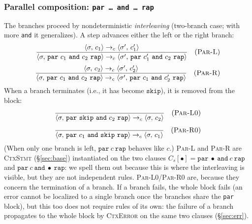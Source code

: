 \subsubsection{Parallel composition: \texttt{par\,\dots\,and\,\dots\,rap}}
\label{sec:par}
The branches proceed by nondeterministic \emph{interleaving} (two-branch case; with
more \texttt{and} it generalizes). A step advances either the left or the right branch:
\[
\dfrac{\cfg{c_1}{\sigma} \toc \cfg{c_1'}{\sigma'}}
      {\cfg{\mathtt{par}\ c_1\ \mathtt{and}\ c_2\ \mathtt{rap}}{\sigma} \toc
       \cfg{\mathtt{par}\ c_1'\ \mathtt{and}\ c_2\ \mathtt{rap}}{\sigma'}} \rname{Par-L}
\]
\[
\dfrac{\cfg{c_2}{\sigma} \toc \cfg{c_2'}{\sigma'}}
      {\cfg{\mathtt{par}\ c_1\ \mathtt{and}\ c_2\ \mathtt{rap}}{\sigma} \toc
       \cfg{\mathtt{par}\ c_1\ \mathtt{and}\ c_2'\ \mathtt{rap}}{\sigma'}} \rname{Par-R}
\]
When a branch terminates (i.e., it has become $\mathtt{skip}$), it is removed
from the block:
\[
\dfrac{}{\cfg{\mathtt{par}\ \mathtt{skip}\ \mathtt{and}\ c_2\ \mathtt{rap}}{\sigma} \toc
       \cfg{c_2}{\sigma}} \rname{Par-L0}
\]
\[
\dfrac{}{\cfg{\mathtt{par}\ c_1\ \mathtt{and}\ \mathtt{skip}\ \mathtt{rap}}{\sigma} \toc
       \cfg{c_1}{\sigma}} \rname{Par-R0}
\]
(When only one branch is left, $\mathtt{par}\ c\ \mathtt{rap}$ behaves like
$c$.) \textsc{Par-L} and \textsc{Par-R} are \textsc{CtxStmt} (\S\ref{sec:base})
instantiated on the two clauses $C_s[\bullet] = \mathtt{par}\ \bullet\
\mathtt{and}\ c\ \mathtt{rap}$ and $\mathtt{par}\ c\ \mathtt{and}\ \bullet\
\mathtt{rap}$: we spell them out because this is where the
interleaving is visible, but they are not independent rules. \textsc{Par-L0}/\textsc{Par-R0}
are, because they concern the termination of a branch. If a branch fails,
the whole block fails (an error cannot be localized to a single branch once
the branches share the \texttt{par} block), but this too does not
require rules of its own: the failure of a branch propagates to the whole block
by \textcolor{red!60!black}{\textsc{CtxError}} on the same two clauses
(\S\ref{sec:err}).

